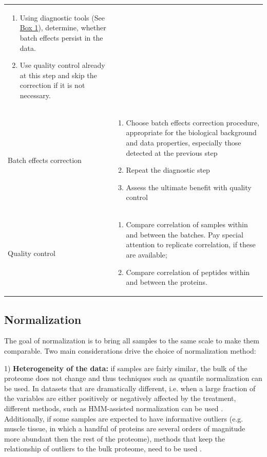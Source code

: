 \documentclass[num-refs]{wiley-article}
\begin{document}
\begin{table}[hbt]
\begin{tcolorbox}
\begin{tabular}{>{\raggedright}p{2cm}m{10.5cm}}
\begin{enumerate}
				\item Using diagnostic tools (See \hyperref[box:Box1_definitions]{Box 1}), determine, whether batch effects persist in the data. 
				\item Use quality control already at this step and skip the correction if it is not necessary. 
				
			\end{enumerate} \\ 
			Batch effects correction	& 	\begin{enumerate}
				\item	Choose batch effects correction procedure, appropriate for the biological background and data properties, especially those detected at the previous step
			\item	Repeat the diagnostic step
			\item	Assess the ultimate benefit with quality control
\end{enumerate} \\ 

			Quality control 	& 	\begin{enumerate}
				
				\item	Compare correlation of samples within and between the batches. Pay special attention to replicate correlation, if these are available;
				\item	Compare correlation of peptides within and between the proteins.	
			\end{enumerate} \\ 
		\end{tabular}
		
	\end{tcolorbox}
\end{table}
\clearpage

 



\subsection{Normalization}

The goal of normalization is to bring all samples to the same scale to make them comparable. Two main considerations drive the choice of normalization method: 

1) \textbf{Heterogeneity of the data: }if samples are fairly similar, the bulk of the proteome does not change and thus techniques such as quantile normalization \cite{Bolstad2003} can be used. In datasets that are dramatically different, i.e. when a large fraction of the variables are either positively or negatively affected by the treatment, different methods, such as HMM-assisted normalization can be used \cite{Landfors2011}. Additionally, if some samples are expected to have informative outliers (e.g. muscle tissue, in which a handful of proteins are several orders of magnitude more abundant then the rest of the proteome), methods that keep the relationship of outliers to the bulk proteome, need to be used \cite{Wang770115}.
\end{document}
